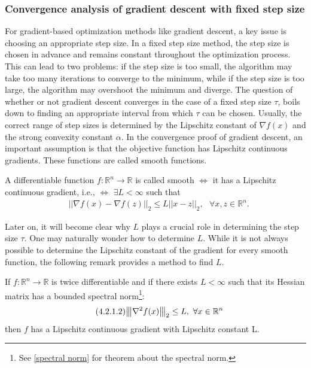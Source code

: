 \subsubsection{Convergence analysis of gradient descent with fixed step size}
For gradient-based optimization methods like gradient descent, a key issue is choosing an appropriate step size. In a fixed step size method, the step size is chosen in advance and remains constant throughout the optimization process. This can lead to two problems: if the step size is too small, the algorithm may take too many iterations to converge to the minimum, while if the step size is too large, the algorithm may overshoot the minimum and diverge. The question of whether or not gradient descent converges in the case of a fixed step size $\tau$, boils down to finding an appropriate interval from which $\tau$ can be chosen. Usually, the correct range of step sizes is determined by the Lipschitz constant of $\nabla f(x)$ and the strong convexity constant $\alpha.$ In the convergence proof of gradient descent, an important assumption is that the objective function has Lipschitz continuous gradients. These functions are called smooth functions.
\begin{definition}
\cite[8]{GDlips}
A differentiable function $f:\mathbb{R}^{n}\longrightarrow\mathbb{R}$ is called smooth $\iff$ it has a Lipschitz continuous gradient, i.e., $\iff$ $\exists L < \infty$ such that
\begin{equation*}\label{eq:14}\tag{4.2.1.1}
\begin{aligned}
    &||\nabla f(x) - \nabla f(z)||_{2} \leq L||x-z||_{2},\text{ } \forall x, z \in \mathbb{R}^{n}.
\end{aligned}
\end{equation*}
\end{definition}
Later on, it will become clear why $L$ plays a crucial role in determining the step size $\tau.$ One may naturally wonder  how to determine $L.$ While it is not always possible to determine the Lipschitz constant of the gradient for every smooth function, the following remark provides a method to find $L.$
\begin{remark}\label{findL}
\cite[10]{GDlips}
If $f:\mathbb{R}^{n}\longrightarrow\mathbb{R}$ is twice differentiable and if there exists $L < \infty$ such that its Hessian matrix has a bounded spectral norm\footnote{See \ref{spectral norm} for theorem about the spectral norm.}:
\begin{equation*}\label{eq:15}\tag{4.2.1.2}
\begin{aligned}
    &{\left\vert\kern-0.25ex\left\vert\kern-0.25ex\left\vert \nabla^{2} f(x) \right\vert\kern-0.25ex\right\vert\kern-0.25ex\right\vert}_{2} \leq L,\text{ } \forall x \in \mathbb{R}^{n}
\end{aligned}
\end{equation*}
then $f$ has a Lipschitz continuous gradient with Lipschitz constant L. 
\end{remark}
